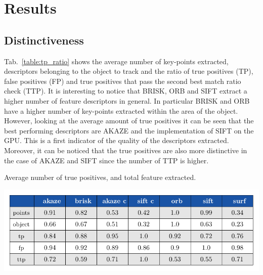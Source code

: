 \section{Results}

\subsection{Distinctiveness}


Tab.~\ref{table:tp_ratio} shows the average number of key-points extracted, descriptors belonging to the object to track and the ratio of true positives (TP), false positives (FP) and true positives that pass the second best match ratio check (TTP). It is interesting to notice that BRISK, ORB and SIFT extract a higher number of feature descriptors in general. In particular BRISK and ORB have a higher number of key-points extracted within the area of the object. However, looking at the average amount of true positives it can be seen that the best performing descriptors are AKAZE and the implementation of SIFT on the GPU. This is a first indicator of the quality of the descriptors extracted. Moreover, it can be noticed that the true positives are also more distinctive in the case of AKAZE and SIFT since the number of TTP is higher.

\begin{table}[t]
\caption{Average number of true positives, and total feature extracted.}
\centerline{%
		\includegraphics[width=0.98\linewidth]{tables/descriptivness_ratio.pdf}}
    \vspace{-2mm} 
	\label{table:tp_ratio}
\end{table}

